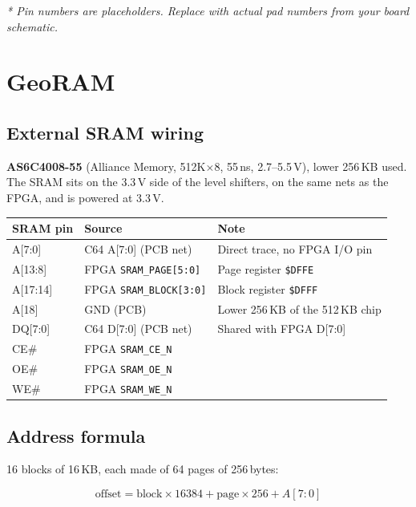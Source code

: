 \documentclass[11pt,a4paper]{article}
\newcommand{\sig}[1]{\texttt{#1}}
\newcommand{\hex}[1]{\texttt{\$#1}}
\begin{document}
\textit{* Pin numbers are placeholders.  Replace with actual pad numbers
from your board schematic.}

\section{GeoRAM}

\subsection{External SRAM wiring}

\textbf{AS6C4008-55} (Alliance Memory, 512K$\times$8, 55\,ns, 2.7--5.5\,V),
lower 256\,KB used.  The SRAM sits on the 3.3\,V side of the level
shifters, on the same nets as the FPGA, and is powered at 3.3\,V.

\begin{center}
\begin{tabular}{lll}
\toprule
\textbf{SRAM pin} & \textbf{Source} & \textbf{Note} \\
\midrule
A[7:0]   & C64 A[7:0] (PCB net)         & Direct trace, no FPGA I/O pin \\
A[13:8]  & FPGA \sig{SRAM\_PAGE[5:0]}   & Page register \hex{DFFE} \\
A[17:14] & FPGA \sig{SRAM\_BLOCK[3:0]}  & Block register \hex{DFFF} \\
A[18]    & GND (PCB)                    & Lower 256\,KB of the 512\,KB chip \\
DQ[7:0]  & C64 D[7:0] (PCB net)         & Shared with FPGA D[7:0] \\
CE\#     & FPGA \sig{SRAM\_CE\_N}       & \\
OE\#     & FPGA \sig{SRAM\_OE\_N}       & \\
WE\#     & FPGA \sig{SRAM\_WE\_N}       & \\
\bottomrule
\end{tabular}
\end{center}

\subsection{Address formula}

16 blocks of 16\,KB, each made of 64 pages of 256\,bytes:

\[
\text{offset} = \text{block} \times 16384 + \text{page} \times 256 + A[7:0]
\]
\end{document}

